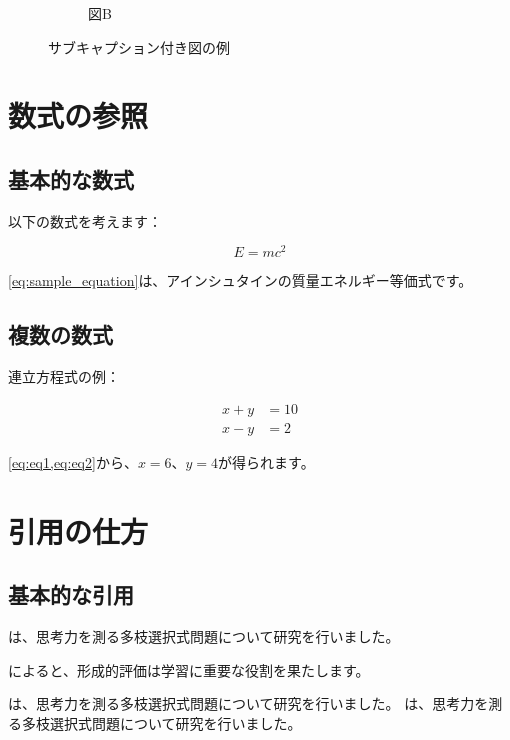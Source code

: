 \documentclass[../main/main.tex]{subfiles}
\begin{document}
\begin{figure}[htbp]
\begin{subfigure}[b]{0.45\textwidth}
        \caption{図B}
        \label{fig:subplot_b}
    \end{subfigure}
    \caption{サブキャプション付き図の例}
    \label{fig:subplots}
\end{figure}

\section{数式の参照}

\subsection{基本的な数式}

以下の数式を考えます：

\begin{equation}
    E = mc^2
    \label{eq:sample_equation}
\end{equation}

\cref{eq:sample_equation}は、アインシュタインの質量エネルギー等価式です。

\subsection{複数の数式}

連立方程式の例：

\begin{align}
    x + y &= 10 \label{eq:eq1} \\
    x - y &= 2 \label{eq:eq2}
\end{align}

\cref{eq:eq1,eq:eq2}から、$x = 6$、$y = 4$が得られます。

\section{引用の仕方}

\subsection{基本的な引用}

\textcite{arai2020japanese}は、思考力を測る多枝選択式問題について研究を行いました。

\textcite{Black1998-yt}によると、形成的評価は学習に重要な役割を果たします。

\parencite{arai2020japanese}は、思考力を測る多枝選択式問題について研究を行いました。
\textcite{arai2020japanese}は、思考力を測る多枝選択式問題について研究を行いました。
\end{document}
